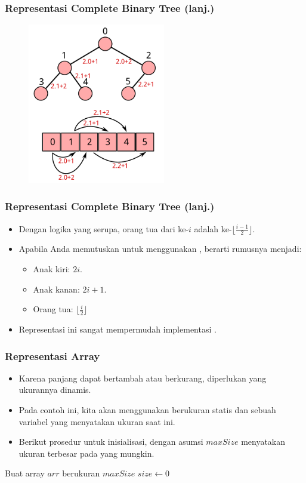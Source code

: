 \begin{frame}
\frametitle{Representasi Complete Binary Tree (lanj.)}
\begin{figure}
  \includegraphics[width=6cm]{asset/heap-array.pdf}
\end{figure}
\end{frame}

\begin{frame}
\frametitle{Representasi Complete Binary Tree (lanj.)}
\begin{itemize}
  \item Dengan logika yang serupa, orang tua dari \fnode ke-$i$ adalah \fnode ke-$\lfloor\frac{i-1}{2}\rfloor$.
  \item Apabila Anda memutuskan untuk menggunakan , berarti rumusnya menjadi:
  \begin{itemize}
    \item Anak kiri: $2i$.
    \item Anak kanan: $2i+1$.
    \item Orang tua: $\lfloor \frac{i}{2} \rfloor$
  \end{itemize}
  \item Representasi ini sangat mempermudah implementasi \pbinaryHeap.
\end{itemize}
\end{frame}

\begin{frame}
\frametitle{Representasi Array}
\begin{itemize}
  \item Karena panjang \farray dapat bertambah atau berkurang, diperlukan \farray yang ukurannya dinamis.
  \item Pada contoh ini, kita akan menggunakan \farray berukuran statis dan sebuah variabel yang menyatakan ukuran \farray saat ini.
  \item Berikut prosedur untuk inisialisasi, dengan asumsi $maxSize$ menyatakan ukuran terbesar pada \pheap yang mungkin.
\end{itemize}
\begin{codebox}
\li \Comment Buat array $arr$ berukuran $maxSize$
\li $size \gets 0$
\end{codebox}
\end{frame}

